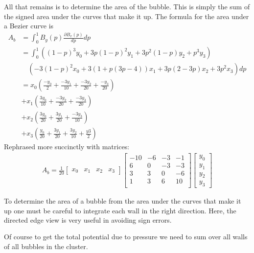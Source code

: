 \documentclass{article}
\begin{document}
All that remains is to determine the area of the bubble. This is simply the sum
of the signed area under the curves that make it up. The formula for the area
under a Bezier curve is
\begin{align*}
A_b &= \int_0^1 B_y(p)\frac{\partial B_x(p)}{dp} dp\\
&=\int_0^1
\left((1-p)^3y_0+3p(1-p)^2y_1+3p^2(1-p)y_2+p^3y_3\right)\\
&\quad \left(-3(1-p)^2x_0 +3(1+p(3p-4))x_1+3p(2-3p)x_2 +3p^2x_3\right)dp\\
&= x_0\left( \frac{-y_0}{2}+ \frac{-3y_1}{10}+\frac{-3y_2}{20}+\frac{-y_3}{20}\right)\\
&+ x_1\left(\frac{3y_0}{10}+ \frac{-3y_2}{20} +\frac{-3y_3}{20}\right)\\
&+ x_2\left(\frac{3y_0}{20}+ \frac{3y_1}{20} +\frac{-3y_3}{10}\right)\\
&+ x_3\left(\frac{y_0}{20} + \frac{3y_1}{20} +\frac{3y_2}{10}
+\frac{y3}{2}\right)
\end{align*}
Rephrased more succinctly with matrices:
\begin{align}
A_b=
\frac{1}{20} 
\begin{bmatrix} x_0 & x_1 & x_2 & x_3 \end{bmatrix}
\begin{bmatrix} 
-10 & -6 & -3 & -1\\
6 & 0 & -3 & -3\\
3 & 3 & 0 & -6\\
1 & 3 & 6 & 10\\ 
\end{bmatrix}
\left[ \begin{array}{c} y_0\\y_1\\y_2\\y_3 \end{array} \right] 
\end{align}

To determine the area of a bubble from the area under the curves that make it up
one must be careful to integrate each wall in the right direction. Here, the
directed edge view is very useful in avoiding sign errors.

Of course to get the total potential due to pressure we need to sum over all
walls of all bubbles in the cluster.
\end{document}
